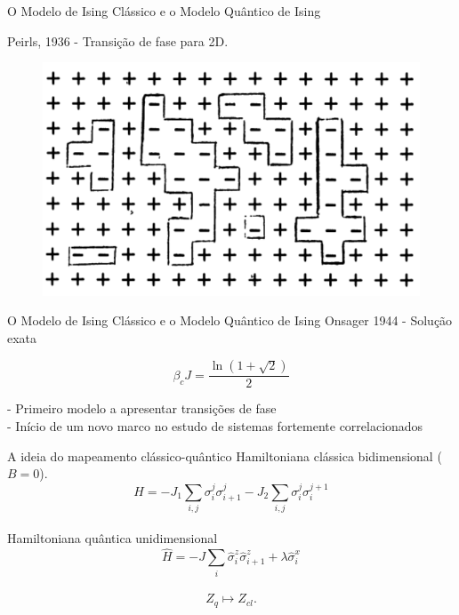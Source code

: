 \documentclass[10pt]{beamer}
\begin{document}
\begin{frame}{O Modelo de Ising Clássico e o Modelo Quântico de Ising}

	Peirls, 1936 - Transição de fase para 2D.
	\begin{figure}[h]
		\center
		\includegraphics[scale=.3]{2d.png}
	\end{figure}
\end{frame}

\begin{frame}{O Modelo de Ising Clássico e o Modelo Quântico de Ising}
	Onsager 1944 - Solução exata
	
	\begin{equation*}
		\beta_c J = \frac{\ln(1+\sqrt{2})}{2}
	\end{equation*}
	
	- Primeiro modelo a apresentar transições de fase\\
	- Início de um novo marco no estudo de sistemas fortemente correlacionados
\end{frame}


\begin{frame}{A ideia do mapeamento clássico-quântico}
	Hamiltoniana clássica bidimensional ($B = 0$).
	\begin{equation*}
		H = - J_1 \sum_{i, j} \sigma_i^j \sigma_{i+1}^j  - J_2 \sum_{i,j} \sigma_i^j \sigma_i^{j+1} 
	\end{equation*}
	\\
	Hamiltoniana quântica unidimensional
	\begin{equation*}
		\hat{H} = -J \sum_i \hat{\sigma}^z_i \hat{\sigma}^z_{i+1} + \lambda \hat{\sigma}^x_i		
	\end{equation*}
	\\
	$$Z_q \mapsto Z_{cl}. $$
\end{frame}
\end{document}

